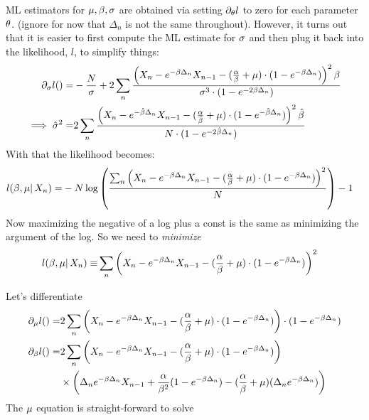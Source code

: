 \documentclass{article}
\begin{document}
ML estimators for ${\mu },{\beta},{\sigma }$ are obtained via setting ${\partial}_{{\theta}} l$ to zero for
each parameter ${\theta}$. (ignore for now that $\Delta_n$ is not the same
throughout). However, it turns out that it is easier to first compute the ML estimate for
${\sigma }$ and then plug it back into the likelihood, $l$, to simplify things:
\begin{align}
{\partial}_{{\sigma }} l()=& -\frac N{{\sigma }} + 2\sum_n
\frac{ \left( X_n - e^{-{\beta} \Delta_n} X_{n-1} -
				 (\frac {{\alpha}}{{\beta}} + {\mu }) \cdot ( 1-e^{-{\beta} \Delta_n}) \right)^2 {\beta}}
				 {{\sigma }^3 \cdot (1-e^{-2{\beta}\Delta_n})}
				 \notag
				 \\ 
\implies \hat{{\sigma }}^2 =& 2\sum_n \frac{ \left( X_n - e^{-\hat{{\beta}} \Delta_n} X_{n-1} -
				 (\frac {{\alpha}}{\hat{{\beta}}} + {\mu }) \cdot ( 1-e^{-\hat{{\beta}} \Delta_n}) \right)^2
				 \hat{{\beta}}} {N \cdot (1-e^{-2\hat{{\beta}}\Delta_n})}
				 \label{eq:sigma_root}
\end{align}
With that the likelihood becomes:
\begin{align*}
l({\beta}, {\mu } |\, X_n )=& 
 -N\log \left( 
 \frac{ \sum_n\left( X_n - e^{-{\beta} \Delta_n} X_{n-1} -
  (\frac {{{\alpha}}}{{{\beta}}} + {\mu }) \cdot ( 1-e^{-{\beta} \Delta_n})
  \right)^2}{N} \right) - 1
\end{align*}
Now maximizing the negative of a log plus a const is the same as minimizing the
argument of the log. So we need to {\itshape minimize}
\begin{align*}
l({\beta}, {\mu } |\, X_n )\equiv& 
\sum_n \left( X_n - e^{-{\beta} \Delta_n} X_{n-1} -
  (\frac {{{\alpha}}}{{{\beta}}} + {\mu }) \cdot ( 1-e^{-{\beta} \Delta_n})
  \right)^2 
\end{align*}
 
Let's differentiate
\begin{subequations}
\begin{align}
{\partial}_{{\mu }} l()=& 2 \sum_n \left( X_n - e^{-{\beta} \Delta_n} X_{n-1} -
  (\frac {{{\alpha}}}{{{\beta}}} + {\mu }) \cdot ( 1-e^{-{\beta} \Delta_n})  \right) 
  \cdot   ( 1-e^{-{\beta} \Delta_n})
\\
{\partial}_{{\beta}} l()=& 2 \sum_n \left( X_n - e^{-{\beta} \Delta_n} X_{n-1} -
  (\frac {{{\alpha}}}{{{\beta}}} + {\mu }) \cdot ( 1-e^{-{\beta} \Delta_n})  \right) 
  \\ \notag 
  & \times \left( \Delta_n e^{- {\beta} \Delta_n}X_{n-1} 
  							  + \frac{ {\alpha} } {{\beta}^2} (1-e^{-{\beta} \Delta_n}) 
  					 		  - (\frac {{{\alpha}}}{{{\beta}}} + {\mu }) ( \Delta_n e^{- {\beta} \Delta_n})          
  					 		  \right)
\end{align}
\end{subequations}
The ${\mu }$ equation is straight-forward to solve
\end{document}
